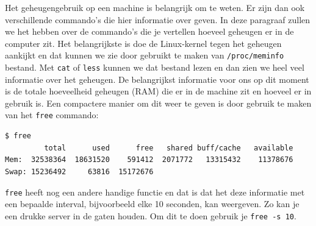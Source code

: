 Het geheugengebruik op een machine is belangrijk om te weten. Er zijn dan ook verschillende commando's die hier informatie over geven. In deze paragraaf zullen we het hebben over de commando's die je vertellen hoeveel geheugen er in de computer zit. Het belangrijkste is doe de Linux-kernel tegen het geheugen aankijkt en dat kunnen we zie door gebruikt te maken van \texttt{/proc/meminfo} bestand. Met \texttt{cat} of \texttt{less} kunnen we dat bestand lezen en dan zien we heel veel informatie over het geheugen. De belangrijkst informatie voor ons op dit moment is de totale hoeveelheid geheugen (RAM) die er in de machine zit en hoeveel er in gebruik is. Een compactere manier om dit weer te geven is door gebruik te maken van het \texttt{free} commando:
\begin{lstlisting}[language=bash]
$ free 
         total      used      free   shared buff/cache   available
Mem:  32538364  18631520    591412  2071772   13315432    11378676
Swap: 15236492     63816  15172676
\end{lstlisting}
\texttt{free} heeft nog een andere handige functie en dat is dat het deze informatie met een bepaalde interval, bijvoorbeeld elke 10 seconden, kan weergeven. Zo kan je een drukke server in de gaten houden. Om dit te doen gebruik je \texttt{free -s 10}.
